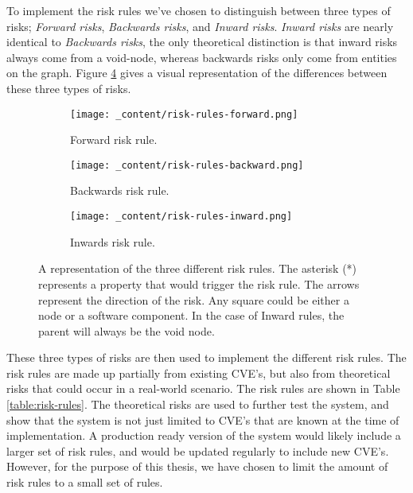To implement the risk rules we've chosen to distinguish between three types of risks; \emph{Forward risks}, \emph{Backwards risks}, and \emph{Inward risks}. \emph{Inward risks} are nearly identical to \emph{Backwards risks}, the only theoretical distinction is that inward risks always come from a void-node, whereas backwards risks only come from entities on the graph. Figure \ref{fig:risk-rules} gives a visual representation of the differences between these three types of risks.

\begin{figure}[H]
    \begin{subfigure}[b]{0.3\textwidth}
        \centering
        \texttt{[image: \_content/risk-rules-forward.png]}
        \caption{Forward risk rule.}
        \label{fig:risk-rule-forward}
    \end{subfigure}
    \begin{subfigure}[b]{0.3\textwidth}
        \centering
        \texttt{[image: \_content/risk-rules-backward.png]}
        \caption{Backwards risk rule.}
        \label{fig:risk-rule-backward}
    \end{subfigure}
    \begin{subfigure}[b]{0.3\textwidth}
        \centering
        \texttt{[image: \_content/risk-rules-inward.png]}
        \caption{Inwards risk rule.}
        \label{fig:risk-rule-inward}
    \end{subfigure}
    \caption{A representation of the three different risk rules. The asterisk (*) represents a property that would trigger the risk rule. The arrows represent the direction of the risk. Any square could be either a node or a software component. In the case of Inward rules, the parent will always be the void node.}
    \label{fig:risk-rules}
\end{figure}

These three types of risks are then used to implement the different risk rules. The risk rules are made up partially from existing CVE's, but also from theoretical risks that could occur in a real-world scenario. The risk rules are shown in Table \ref{table:risk-rules}. The theoretical risks are used to further test the system, and show that the system is not just limited to CVE's that are known at the time of implementation. A production ready version of the system would likely include a larger set of risk rules, and would be updated regularly to include new CVE's. However, for the purpose of this thesis, we have chosen to limit the amount of risk rules to a small set of rules.

